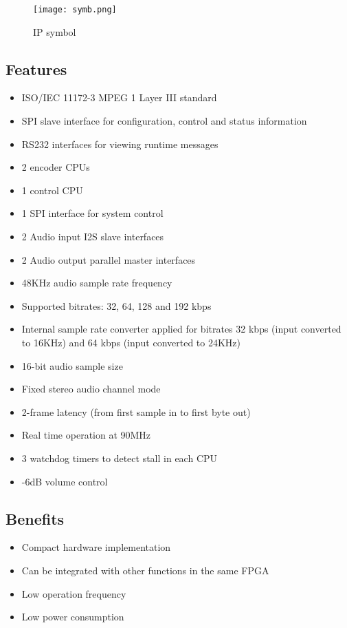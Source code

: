 \documentclass{ug}
\theoremstyle{plain}
\begin{document}
\begin{figure}[h]
  \begin{center}
    \texttt{[image: symb.png]}
    \caption{IP symbol}
    \label{fig:symb}
  \end{center}
\end{figure}
\clearpage

\subsection{Features}

\begin{itemize}
\item ISO/IEC 11172-3 MPEG 1 Layer III standard
\item SPI slave interface for configuration, control and status information
\item RS232 interfaces for viewing runtime messages
\item 2 encoder CPUs
\item 1 control CPU
\item 1 SPI interface for system control 
\item 2 Audio input I2S slave interfaces
\item 2 Audio output parallel master interfaces
\item 48KHz audio sample rate frequency
\item Supported bitrates: 32, 64, 128 and 192 kbps
\item Internal sample rate converter applied for bitrates 32 kbps (input
  converted to 16KHz) and 64 kbps (input converted to 24KHz)
\item 16-bit audio sample size
\item Fixed stereo audio channel mode
\item 2-frame latency (from first sample in to first byte out)
\item Real time operation at 90MHz
\item 3 watchdog timers to detect stall in each CPU
\item -6dB volume control
\end{itemize}

\subsection{Benefits}
\begin{itemize}
\item Compact hardware implementation
\item Can be integrated with other functions in the same FPGA
\item Low operation frequency
\item Low power consumption
\end{itemize}
\end{document}

